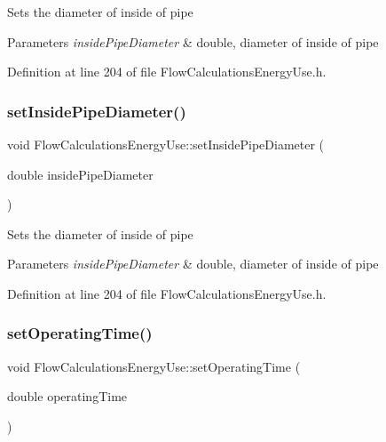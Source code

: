 Sets the diameter of inside of pipe


\begin{DoxyParams}{Parameters}
{\em inside\+Pipe\+Diameter} & double, diameter of inside of pipe \\
\hline
\end{DoxyParams}


Definition at line 204 of file Flow\+Calculations\+Energy\+Use.\+h.

\mbox{\label{class_flow_calculations_energy_use_a616486580460b616a7a8c4935119cd6c}} 
\subsubsection{\texorpdfstring{set\+Inside\+Pipe\+Diameter()}{setInsidePipeDiameter()}\hspace{0.1cm}{\footnotesize\ttfamily [3/3]}}
{\footnotesize\ttfamily void Flow\+Calculations\+Energy\+Use\+::set\+Inside\+Pipe\+Diameter (\begin{DoxyParamCaption}\item[{double}]{inside\+Pipe\+Diameter }\end{DoxyParamCaption})\hspace{0.3cm}{\ttfamily [inline]}}

Sets the diameter of inside of pipe


\begin{DoxyParams}{Parameters}
{\em inside\+Pipe\+Diameter} & double, diameter of inside of pipe \\
\hline
\end{DoxyParams}


Definition at line 204 of file Flow\+Calculations\+Energy\+Use.\+h.

\mbox{\label{class_flow_calculations_energy_use_ac82800d533502c7836238dcab1f39fac}} 
\subsubsection{\texorpdfstring{set\+Operating\+Time()}{setOperatingTime()}\hspace{0.1cm}{\footnotesize\ttfamily [1/3]}}
{\footnotesize\ttfamily void Flow\+Calculations\+Energy\+Use\+::set\+Operating\+Time (\begin{DoxyParamCaption}\item[{double}]{operating\+Time }\end{DoxyParamCaption})\hspace{0.3cm}{\ttfamily [inline]}}

